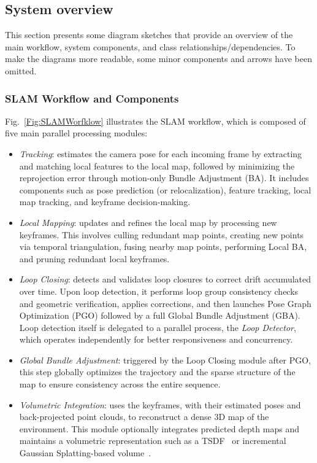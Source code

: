\documentclass{article}
\begin{document}
\subsection{System overview}\label{system_overview}

This section presents some diagram sketches that provide an overview of the main workflow, system components, and class relationships/dependencies. To make the diagrams more readable, some minor components and arrows have been omitted.


\subsubsection{SLAM Workflow and Components} 

Fig.~\ref{Fig:SLAMWorfklow} illustrates the SLAM workflow, which is composed of five main parallel processing modules:

\begin{itemize}
\item \textit{Tracking}: estimates the camera pose for each incoming frame by extracting and matching local features to the local map, followed by minimizing the reprojection error through motion-only Bundle Adjustment (BA). It includes components such as pose prediction (or relocalization), feature tracking, local map tracking, and keyframe decision-making.
\item \textit{Local Mapping}: updates and refines the local map by processing new keyframes. This involves culling redundant map points, creating new points via temporal triangulation, fusing nearby map points, performing Local BA, and pruning redundant local keyframes.
\item \textit{Loop Closing}: detects and validates loop closures to correct drift accumulated over time. Upon loop detection, it performs loop group consistency checks and geometric verification, applies corrections, and then launches Pose Graph Optimization (PGO) followed by a full Global Bundle Adjustment (GBA). Loop detection itself is delegated to a parallel process, the \textit{Loop Detector}, which operates independently for better responsiveness and concurrency.
\item \textit{Global Bundle Adjustment}: triggered by the Loop Closing module after PGO, this step globally optimizes the trajectory and the sparse structure of the map to ensure consistency across the entire sequence.
\item \textit{Volumetric Integration}: uses the keyframes, with their estimated poses and back-projected point clouds, to reconstruct a dense 3D map of the environment. This module optionally integrates predicted depth maps and maintains a volumetric representation such as a TSDF~\cite{dong2022ash} or incremental Gaussian Splatting-based volume~\cite{matsuki2023gaussian,kerbl20233d}.
\end{itemize}
\end{document}
